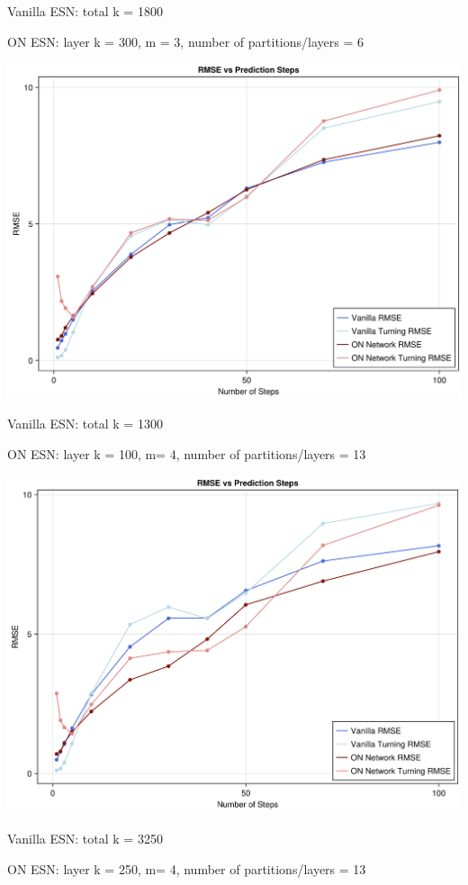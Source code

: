 \documentclass[a4paper,12pt]{article}
\begin{document}
\newpage

Vanilla ESN: total k = 1800

ON ESN: layer k = 300, m = 3, number of partitions/layers = 6

\includegraphics[width=\textwidth]{figure_6.png}


\newpage

Vanilla ESN: total k = 1300

ON ESN: layer k = 100, m= 4, number of partitions/layers = 13

\includegraphics[width=\textwidth]{figure_7.png}


\newpage

Vanilla ESN: total k = 3250

ON ESN: layer k = 250, m= 4, number of partitions/layers = 13
\end{document}
